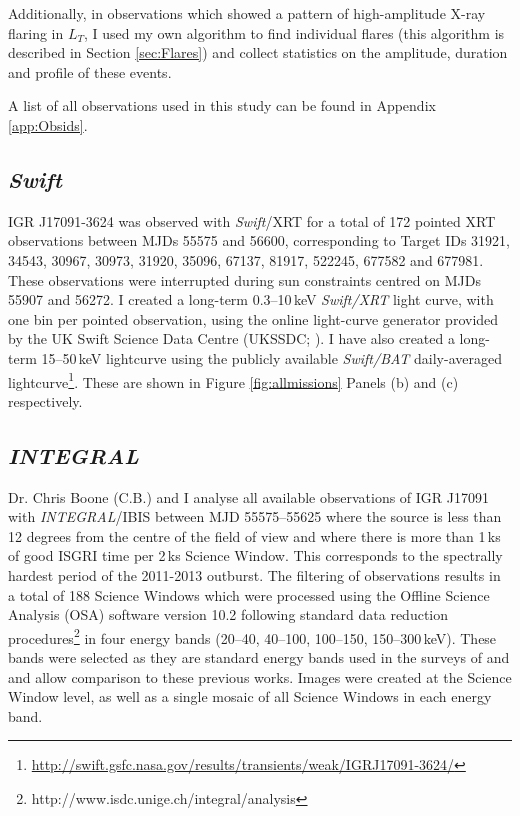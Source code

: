 \par Additionally, in observations which showed a pattern of high-amplitude X-ray flaring in $L_T$, I used my own algorithm to find individual flares (this algorithm is described in Section \ref{sec:Flares}) and collect statistics on the amplitude, duration and profile of these events.
\par A list of all observations used in this study can be found in Appendix \ref{app:Obsids}.

\subsection{\textit{Swift}}

\par IGR J17091-3624 was observed with \textit{Swift}/XRT for a total of 172 pointed XRT observations between MJDs 55575 and 56600, corresponding to Target IDs 31921, 34543, 30967, 30973, 31920, 35096, 67137, 81917, 522245, 677582 and 677981.  These observations were interrupted during sun constraints centred on MJDs 55907 and 56272.  I created a long-term 0.3--10\,keV \textit{Swift/XRT} light curve, with one bin per pointed observation, using the online light-curve generator provided by the UK Swift Science Data Centre (UKSSDC; \citealp{Evans_Swift1}).  I have also created a long-term 15--50\,keV lightcurve using the publicly available \textit{Swift/BAT} daily-averaged lightcurve\footnote{\url{http://swift.gsfc.nasa.gov/results/transients/weak/IGRJ17091-3624/}}.  These are shown in Figure \ref{fig:allmissions} Panels (b) and (c) respectively.

\subsection{\textit{INTEGRAL}}

\par Dr. Chris Boone (\textsf{C.B.}) and I analyse all available observations of IGR J17091 with \textit{INTEGRAL}/IBIS \citep{Ubertini_IBIS} between MJD 55575--55625 where the source is less than 12 degrees from the centre of the field of view and where there is more than 1\,ks of good ISGRI time per 2\,ks Science Window. This corresponds to the spectrally hardest period of the 2011-2013 outburst. The filtering of observations results in a total of 188 Science Windows which were processed using the Offline Science Analysis (OSA) software version 10.2 following standard data reduction procedures\footnote{http://www.isdc.unige.ch/integral/analysis} in four energy bands (20--40, 40--100, 100--150, 150--300\,keV). These bands were selected as they are standard energy bands used in the surveys of \citet{Bird_Survey} and \citet{Bazzano_Survey} and allow comparison to these previous works. Images were created at the Science Window level, as well as a single mosaic of all Science Windows in each energy band.


